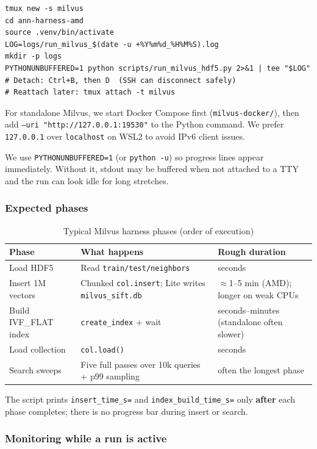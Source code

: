 \documentclass[11pt,a4paper]{article}
\begin{document}
\begin{verbatim}
tmux new -s milvus
cd ann-harness-amd
source .venv/bin/activate
LOG=logs/run_milvus_$(date -u +%Y%m%d_%H%M%S).log
mkdir -p logs
PYTHONUNBUFFERED=1 python scripts/run_milvus_hdf5.py 2>&1 | tee "$LOG"
# Detach: Ctrl+B, then D  (SSH can disconnect safely)
# Reattach later: tmux attach -t milvus
\end{verbatim}

For standalone Milvus, we start Docker Compose first (\texttt{milvus-docker/}), then add
\texttt{--uri "http://127.0.0.1:19530"} to the Python command. We prefer
\texttt{127.0.0.1} over \texttt{localhost} on WSL2 to avoid IPv6 client issues.

We use \texttt{PYTHONUNBUFFERED=1} (or \texttt{python -u}) so progress lines appear
immediately. Without it, stdout may be buffered when not attached to a TTY and the
run can look idle for long stretches.

\subsubsection*{Expected phases}

\begin{table}[h]
\centering
\caption{Typical Milvus harness phases (order of execution)}
\begin{tabular}{@{}p{}p{}p{}@{}}
\toprule
\textbf{Phase} & \textbf{What happens} & \textbf{Rough duration} \\
\midrule
Load HDF5 & Read \texttt{train/test/neighbors} & seconds \\
Insert 1M vectors & Chunked \texttt{col.insert}; Lite writes \texttt{milvus\_sift.db} & $\approx$1--5 min (AMD); longer on weak CPUs \\
Build IVF\_FLAT index & \texttt{create\_index} + wait & seconds--minutes (standalone often slower) \\
Load collection & \texttt{col.load()} & seconds \\
Search sweeps & Five full passes over 10k queries + p99 sampling & often the longest phase \\
\bottomrule
\end{tabular}
\end{table}

The script prints \texttt{insert\_time\_s=} and \texttt{index\_build\_time\_s=} only
\textbf{after} each phase completes; there is no progress bar during insert or search.

\subsubsection*{Monitoring while a run is active}
\end{document}
